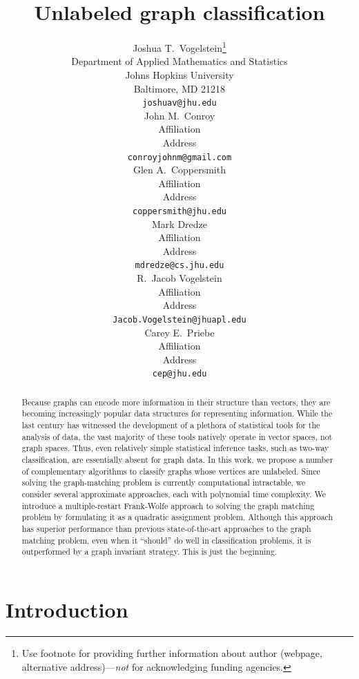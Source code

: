 \documentclass{article} %
\title{Unlabeled graph classification}
\author{
Joshua T.~Vogelstein\thanks{ Use footnote for providing further information
about author (webpage, alternative address)---\emph{not} for acknowledging
funding agencies.} \\
Department of Applied Mathematics and Statistics\\
Johns Hopkins University\\
Baltimore, MD 21218 \\
\texttt{joshuav@jhu.edu} \\
\And
John M.~Conroy \\
Affiliation \\
Address \\
\texttt{conroyjohnm@gmail.com} \\
\AND
Glen A.~Coppersmith \\
Affiliation \\
Address \\
\texttt{coppersmith@jhu.edu} \\
\And
Mark Dredze \\
Affiliation \\
Address \\
\texttt{mdredze@cs.jhu.edu} \\
\And
R.~Jacob Vogelstein \\
Affiliation \\
Address \\
\texttt{Jacob.Vogelstein@jhuapl.edu} \\
\And
Carey E.~Priebe \\
Affiliation \\
Address \\
\texttt{cep@jhu.edu} \\
}
\begin{document}
\maketitle

\begin{abstract}
Because graphs can encode more information in their structure than vectors, they are becoming increasingly popular data structures for representing information.  While the last century has witnessed the development of a plethora of statistical tools for the analysis of data, the vast majority of these tools natively operate in vector spaces, not graph spaces.  Thus, even relatively simple statistical inference tasks, such as two-way classification,  are essentially absent for graph data.  In this work, we propose a number of complementary algorithms to classify graphs whose vertices are unlabeled.  Since solving the graph-matching problem is currently computational intractable, we consider several approximate approaches, each with polynomial time complexity.  We introduce a multiple-restart Frank-Wolfe approach to solving the graph matching problem by formulating it as a quadratic assignment problem.  Although this approach has superior performance than previous state-of-the-art approaches to the graph matching problem, even when it ``should'' do well in classification problems, it is outperformed by a graph invariant strategy.  This is just the beginning. 
\end{abstract}

\section{Introduction}
\end{document}
